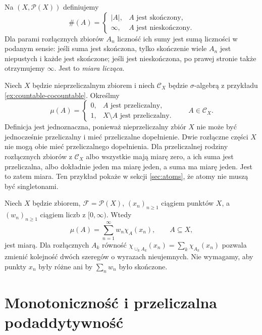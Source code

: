 \begin{przyklad}
\label{ex:counting}
Na $(X,\mathcal P(X))$ definiujemy
\[
\#(A)=\begin{cases}
|A|,&A\text{ jest skończony},\\
\infty,&A\text{ jest nieskończony}.
\end{cases}
\]
Dla parami rozłącznych zbiorów $A_n$ liczność ich sumy jest sumą
liczności w podanym sensie: jeśli suma jest skończona, tylko
skończenie wiele $A_n$ jest niepustych i każde jest skończone;
jeśli jest nieskończona, po prawej stronie także otrzymujemy
$\infty$. Jest to \emph{miara licząca}.
\end{przyklad}

\begin{przyklad}
\label{ex:cocountable-measure}
Niech $X$ będzie nieprzeliczalnym zbiorem i niech
$\mathcal C_X$ będzie $\sigma$-algebrą z przykładu
\ref{ex:countable-cocountable}. Określmy
\[
\mu(A)=\begin{cases}
0,&A\text{ jest przeliczalny},\\
1,&X\setminus A\text{ jest przeliczalny}.
\end{cases}
\qquad A\in\mathcal C_X.
\]
Definicja jest jednoznaczna, ponieważ nieprzeliczalny zbiór
$X$ nie może być jednocześnie przeliczalny i mieć przeliczalne
dopełnienie. Dwie rozłączne części $X$ nie mogą obie mieć
przeliczalnego dopełnienia. Dla przeliczalnej rodziny
rozłącznych zbiorów z $\mathcal C_X$ albo wszystkie mają miarę
zero, a ich suma jest przeliczalna, albo dokładnie jeden ma
miarę jeden, a suma ma miarę jeden. Jest to zatem miara.
Ten przykład pokaże w sekcji \ref{sec:atoms}, że atomy
nie muszą być singletonami.
\end{przyklad}

\begin{przyklad}
\label{ex:weighted-discrete}
Niech $X$ będzie zbiorem, $\mathcal F=\mathcal P(X)$,
$(x_n)_{n\geq1}$ ciągiem punktów $X$, a $(w_n)_{n\geq1}$
ciągiem liczb z $[0,\infty)$. Wtedy
\[
\mu(A)=\sum_{n=1}^{\infty}w_n\chi_A(x_n),
\qquad A\subseteq X,
\]
jest miarą. Dla rozłącznych $A_k$ równość
$\chi_{\cup_kA_k}(x_n)=\sum_k\chi_{A_k}(x_n)$
pozwala zmienić kolejność dwóch szeregów o wyrazach
nieujemnych. Nie wymagamy, aby punkty $x_n$ były różne ani by
$\sum_nw_n$ było skończone.
\end{przyklad}

\section{Monotoniczność i przeliczalna podaddytywność}

